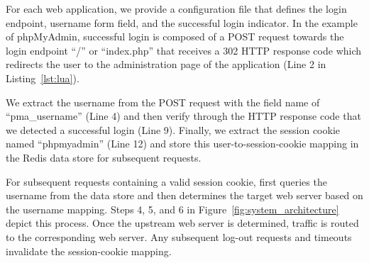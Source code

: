 For each web application, we provide a configuration file that defines the login endpoint, username form field, and the successful login indicator. 
In the example of phpMyAdmin, successful login is composed of a POST request towards the login endpoint ``/'' or ``index.php'' that receives a 302 HTTP response code which redirects the user to the administration page of the application (Line 2 in Listing~\ref{lst:lua}). 

We extract the username from the POST request with the field name of ``pma\_username'' (Line 4) 
and then verify through the HTTP response code that we detected a successful login (Line 9). Finally, we extract the session cookie named ``phpmyadmin'' (Line 12) and store this user-to-session-cookie mapping in the Redis data store for subsequent requests. 

For subsequent requests containing a valid session cookie, \sys{} first queries the username from the data store and then determines the target web server based on the username mapping. 
Steps 4, 5, and 6 in Figure~\ref{fig:system_architecture} depict this process. 
Once the upstream web server is determined, traffic is routed to the corresponding web server. 
Any subsequent log-out requests and timeouts invalidate the session-cookie mapping.